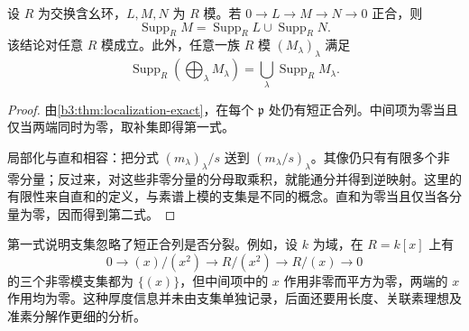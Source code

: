 \begin{proposition}\label{b3:prop:support-exact}
	设 \(R\) 为交换含幺环，\(L,M,N\) 为 \(R\) 模。若 \(0\rightarrow L\rightarrow M\rightarrow N\rightarrow0\) 正合，则
	\[
		\operatorname{Supp}_R M =\operatorname{Supp}_R L\cup\operatorname{Supp}_R N.
	\]
	该结论对任意 \(R\) 模成立。此外，任意一族 \(R\) 模 \((M_\lambda)_\lambda\) 满足
	\[
		\operatorname{Supp}_R\left(\bigoplus_{\lambda}M_\lambda\right) =\bigcup_{\lambda}\operatorname{Supp}_R M_\lambda.
	\]
\end{proposition}
\begin{proof}
	由\cref{b3:thm:localization-exact}，在每个 \(\mathfrak p\) 处仍有短正合列。中间项为零当且仅当两端同时为零，取补集即得第一式。

	局部化与直和相容：把分式 \((m_\lambda)_\lambda/s\) 送到 \((m_\lambda/s)_\lambda\)。其像仍只有有限多个非零分量；反过来，对这些非零分量的分母取乘积，就能通分并得到逆映射。这里的有限性来自直和的定义，与素谱上模的支集是不同的概念。直和为零当且仅当各分量为零，因而得到第二式。
\end{proof}

第一式说明支集忽略了短正合列是否分裂。例如，设 \(k\) 为域，在 \(R=k[x]\) 上有
\[
	0\longrightarrow(x)/(x^2)\longrightarrow R/(x^2) \longrightarrow R/(x)\longrightarrow0
\]
的三个非零模支集都为 \(\bigl\{(x)\bigr\}\)，但中间项中的 \(x\) 作用非零而平方为零，两端的 \(x\) 作用均为零。这种厚度信息并未由支集单独记录，后面还要用长度、关联素理想及准素分解作更细的分析。
